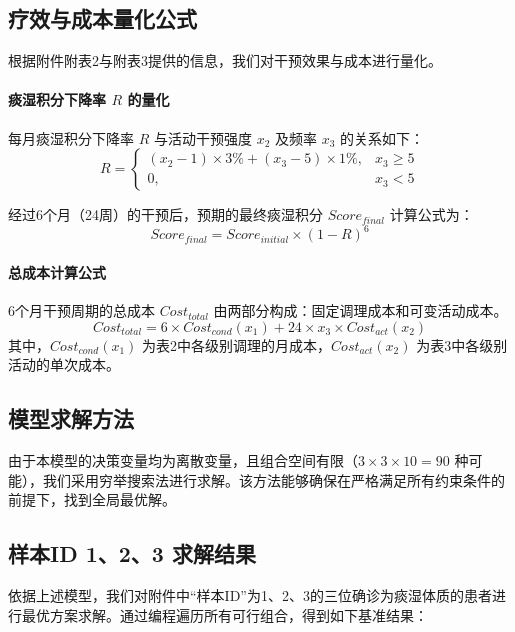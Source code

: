 \documentclass[12pt,a4paper]{article}
\begin{document}
\subsection{疗效与成本量化公式}
根据附件附表2与附表3提供的信息，我们对干预效果与成本进行量化。

\paragraph{痰湿积分下降率 $R$ 的量化}
每月痰湿积分下降率 $R$ 与活动干预强度 $x_2$ 及频率 $x_3$ 的关系如下：
\begin{equation}
R =
\begin{cases}
 (x_2 - 1) \times 3\% + (x_3 - 5) \times 1\%, & x_3 \ge 5 \\
0, & x_3 < 5
\end{cases}
\end{equation}

经过6个月（24周）的干预后，预期的最终痰湿积分 $Score_{final}$ 计算公式为：
\begin{equation}
Score_{final} = Score_{initial} \times (1 - R)^6
\end{equation}

\paragraph{总成本计算公式}
6个月干预周期的总成本 $Cost_{total}$ 由两部分构成：固定调理成本和可变活动成本。
\begin{equation}
Cost_{total} = 6 \times Cost_{cond}(x_1) + 24 \times x_3 \times Cost_{act}(x_2)
\end{equation}
其中，$Cost_{cond}(x_1)$ 为表2中各级别调理的月成本，$Cost_{act}(x_2)$ 为表3中各级别活动的单次成本。

\subsection{模型求解方法}
由于本模型的决策变量均为离散变量，且组合空间有限（$3 \times 3 \times 10 = 90$ 种可能），我们采用穷举搜索法进行求解。该方法能够确保在严格满足所有约束条件的前提下，找到全局最优解。

\subsection{样本ID 1、2、3 求解结果}
依据上述模型，我们对附件中“样本ID”为1、2、3的三位确诊为痰湿体质的患者进行最优方案求解。通过编程遍历所有可行组合，得到如下基准结果：
\end{document}
